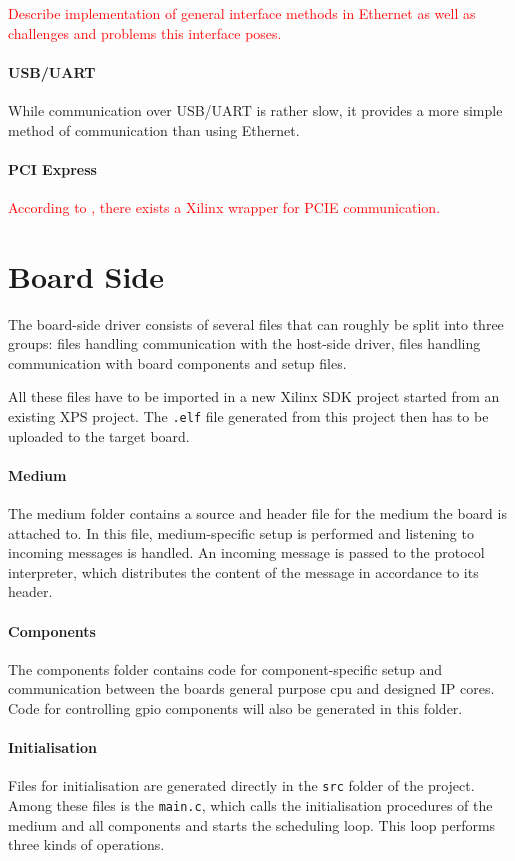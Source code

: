 \documentclass{report}
\begin{document}
\textcolor{red}{Describe implementation of general interface methods in Ethernet as well as challenges and problems this interface poses.}

\paragraph{USB/UART}
While communication over USB/UART is rather slow, it provides a more simple method of communication than using Ethernet. 

\paragraph{PCI Express}
\textcolor{red}{According to \cite{alachiotis10}, there exists a Xilinx wrapper for PCIE communication.}

\newpage
\section{Board Side}
The board-side driver consists of several files that can roughly be split into three groups: files handling communication with the host-side driver, files handling communication with board components and setup files.

All these files have to be imported in a new Xilinx SDK project started from an existing XPS project. The \texttt{.elf} file generated from this project then has to be uploaded to the target board.

\paragraph{Medium}
The medium folder contains a source and header file for the medium the board is attached to. In this file, medium-specific setup is performed and listening to incoming messages is handled. An incoming message is passed to the protocol interpreter, which distributes the content of the message in accordance to its header.

\paragraph{Components}
The components folder contains code for component-specific setup and communication between the boards general purpose cpu and designed IP cores. Code for controlling gpio components will also be generated in this folder.

\paragraph{Initialisation}
Files for initialisation are generated directly in the \texttt{src} folder of the project. Among these files is the \texttt{main.c}, which calls the initialisation procedures of the medium and all components and starts the scheduling loop. This loop performs three kinds of operations.
\end{document}
